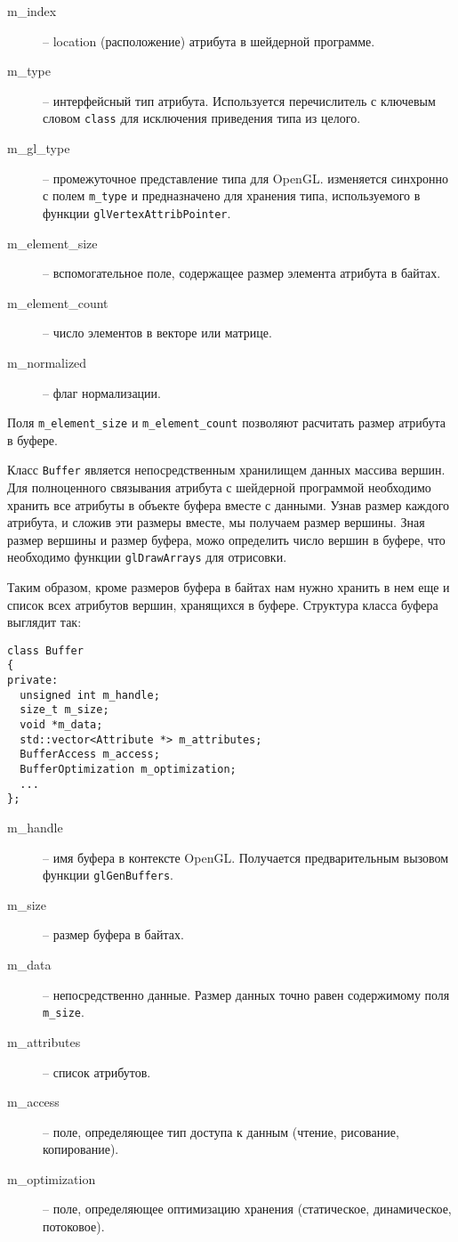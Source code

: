 \documentclass[a4paper, 12pt]{article}
\begin{document}
\begin{description}
      \item[m\_index] -- location (расположение) атрибута в шейдерной
            программе.
      \item[m\_type] -- интерфейсный тип атрибута. Используется перечислитель
            с ключевым словом \texttt{class} для исключения приведения типа
            из целого.
      \item[m\_gl\_type] -- промежуточное представление типа для OpenGL.
            изменяется синхронно с полем \texttt{m\_type} и предназначено для
            хранения типа, используемого в функции
            \texttt{glVertexAttribPointer}.
      \item[m\_element\_size] -- вспомогательное поле, содержащее размер
            элемента атрибута в байтах.
      \item[m\_element\_count] -- число элементов в векторе или матрице.
      \item[m\_normalized] -- флаг нормализации.
\end{description}

Поля \texttt{m\_element\_size} и \texttt{m\_element\_count} позволяют расчитать
размер атрибута в буфере.

Класс \texttt{Buffer} является непосредственным хранилищем данных массива
вершин. Для полноценного связывания атрибута с шейдерной программой необходимо
хранить все атрибуты в объекте буфера вместе с данными. Узнав размер каждого
атрибута, и сложив эти размеры вместе, мы получаем размер вершины. Зная размер
вершины и размер буфера, можо определить число вершин в буфере, что необходимо
функции \texttt{glDrawArrays} для отрисовки.

Таким образом, кроме размеров буфера в байтах нам нужно хранить в нем еще и
список всех атрибутов вершин, хранящихся в буфере. Структура класса буфера
выглядит так:

\begin{verbatim}
class Buffer
{
private:
  unsigned int m_handle;
  size_t m_size;
  void *m_data;
  std::vector<Attribute *> m_attributes;
  BufferAccess m_access;
  BufferOptimization m_optimization;
  ...
};
\end{verbatim}

\begin{description}
      \item[m\_handle] -- имя буфера в контексте OpenGL. Получается
            предварительным вызовом функции \texttt{glGenBuffers}.
      \item[m\_size] -- размер буфера в байтах.
      \item[m\_data] -- непосредственно данные. Размер данных точно равен
            содержимому поля \texttt{m\_size}.
      \item[m\_attributes] -- список атрибутов.
      \item[m\_access] -- поле, определяющее тип доступа к данным (чтение,
            рисование, копирование).
      \item[m\_optimization] -- поле, определяющее оптимизацию хранения
      (статическое, динамическое, потоковое).
\end{description}
\end{document}
